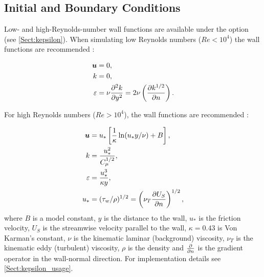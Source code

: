 \subsection{Initial and Boundary Conditions}

Low- and high-Reynolds-number wall functions are available under the option \linebreak {} (see \ref{Sect:kepsilon}). When simulating low Reynolds numbers ($Re<10^4$) the  wall functions are recommended \citep{wilcox1998turbulence}:

\begin{align}
\bmu &= 0, \label{ubc1}\\
k &= 0, \label{kbc1}\\
\epsilon &= \nu \ppxx[y]{k} = 2 \nu \left ( \ppx[n]{k^{1/2}} \right ). \label{epsbc1}
\end{align}

For high Reynolds numbers ($Re>10^4$), the  wall functions are recommended \citep{wilcox1998turbulence}:

\begin{align}
\bmu &= u_* \left [ \frac{1}{\kappa} \ln (u_* y / \nu) + B \right ], \label{ubc2}\\
k &= \frac{u_*^2}{C_{\mu}^{1/2}}, \label{kbc2}\\
\epsilon &= \frac{u_*^3}{\kappa y}, \label{epsbc2}\\
u_* &= (\tau_w / \rho)^{1/2} = \left ( \nu_T \ppx[n]{U_S} \right )^{1/2}, \label{ustar}
\end{align}
where $B$ is a model constant, $y$ is the distance to the wall, $u_*$ is the friction velocity, $U_S$ is the streamwise velocity parallel to the wall, $\kappa=0.43$ is Von Karman's constant, $\nu$ is the kinematic laminar (background) viscosity, $\nu_T$ is the kinematic eddy (turbulent) viscosity, $\rho$ is the density and $\ppx[n]{}$ is the gradient operator in the wall-normal direction. For implementation details see \ref{Sect:kepsilon_usage}.

